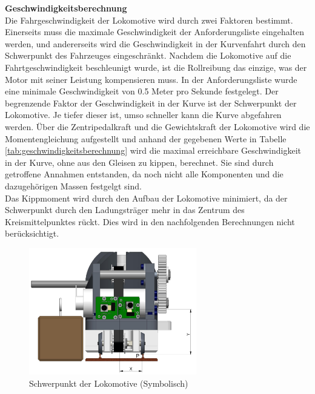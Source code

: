 \documentclass[../../main.tex]{subfiles}
\begin{document}
    \label{GeschwindigkeitsberechnungFahrwerk}
    \textbf{Geschwindigkeitsberechnung}\\
    Die Fahrgeschwindigkeit der Lokomotive wird durch zwei Faktoren bestimmt. Einerseits muss die maximale Geschwindigkeit der Anforderungsliste eingehalten werden, und andererseits wird die Geschwindigkeit in der Kurvenfahrt durch den Schwerpunkt des Fahrzeuges eingeschränkt. Nachdem die Lokomotive auf die Fahrtgeschwindigkeit beschleunigt wurde, ist die Rollreibung das einzige, was der Motor mit seiner Leistung kompensieren muss. In der Anforderungsliste wurde eine minimale Geschwindigkeit von 0.5 Meter pro Sekunde festgelegt. Der begrenzende Faktor der Geschwindigkeit in der Kurve ist der Schwerpunkt der Lokomotive. Je tiefer dieser ist, umso schneller kann die Kurve abgefahren werden. Über die Zentripedalkraft und die Gewichtskraft der Lokomotive wird die Momentengleichung aufgestellt und anhand der gegebenen Werte in Tabelle \ref{tab:geschwindigkeitsberechnung} wird die maximal erreichbare Geschwindigkeit in der Kurve, ohne aus den Gleisen zu kippen, berechnet. Sie sind durch getroffene Annahmen entstanden, da noch nicht alle Komponenten und die dazugehörigen Massen festgelgt sind.\\
    Das Kippmoment wird durch den Aufbau der Lokomotive minimiert, da der Schwerpunkt durch den Ladungsträger mehr in das Zentrum des Kreismittelpunktes rückt. Dies wird in den nachfolgenden Berechnungen nicht berücksichtigt.\\

    \begin{figure}[H] %
        \centering
        \includegraphics[width=0.65\textwidth]{schwerpunkt.png}
        \caption{Schwerpunkt der Lokomotive (Symbolisch)}
        \label{fig:schwerpunkt}
    \end{figure}
\end{document}
